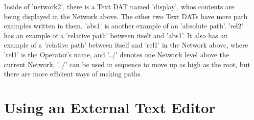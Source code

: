 \begin{fullwidth}
Inside of 'network2', there is a Text DAT named 'display', whos contents are being displayed in the Network above. The other two Text DATs have more path examples written in them. 'abs1' is another example of an 'absolute path'. 'rel2' has an example of a 'relative path' between itself and 'abs1'. It also has an example of a 'relative path' between itself and 'rel1' in the Network above, where 'rel1' is the Operator's name, and '../' denotes one Network level above the current Network. '../' can be used in sequence to move up as high as the root, but there are more efficient ways of making paths.


\end{fullwidth}


\section{Using an External Text Editor}
